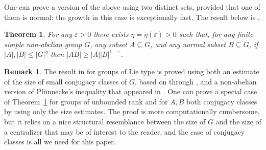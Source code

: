 \documentclass[a4paper]{article}
\newtheorem{theorem}[proposition]{Theorem}
\theoremstyle{definition}
\newtheorem{remark}[proposition]{Remark}
\numberwithin{equation}{section}
\begin{document}
One can prove a version of the above using two distinct sets, provided that one of them is normal; the growth in this case is exceptionally fast. The result below is \cite{DMP24}.

\begin{theorem}\label{th:dmp}
For any $\varepsilon>0$ there exists $\eta=\eta(\varepsilon)>0$ such that, for any finite simple non-abelian group $G$, any subset $A\subseteq G$, and any normal subset $B\subseteq G$, if $|A|,|B|\leq|G|^{\eta}$ then $|AB|\geq|A||B|^{1-\varepsilon}$.
\end{theorem}

\begin{remark}
The result in \cite{DMP24} for groups of Lie type is proved using both an estimate of the size of small conjugacy classes of $G$, based on \cite[\S\S 3-4]{LS12} through \cite[\S 3]{LSS17}, and a non-abelian version of Pl\"unnecke's inequality that appeared in \cite[Thm.~4.1]{GPSS13}. One can prove a special case of Theorem~\ref{th:dmp} for groups of unbounded rank and for $A,B$ both conjugacy classes by using only the size estimates. The proof is more computationally cumbersome, but it relies on a nice structural resemblance between the size of $G$ and the size of a centralizer that may be of interest to the reader, and the case of conjugacy classes is all we need for this paper. 


\end{remark}
\end{document}
